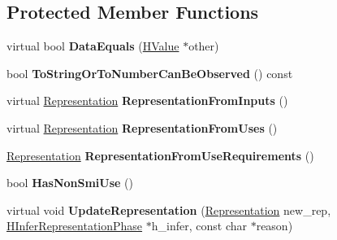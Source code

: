 \subsection*{Protected Member Functions}
\begin{DoxyCompactItemize}
\item 
\hypertarget{classv8_1_1internal_1_1_h_value_a4638f99e18888fefa1c5507f697a1688}{}virtual bool {\bfseries Data\+Equals} (\hyperlink{classv8_1_1internal_1_1_h_value}{H\+Value} $\ast$other)\label{classv8_1_1internal_1_1_h_value_a4638f99e18888fefa1c5507f697a1688}

\item 
\hypertarget{classv8_1_1internal_1_1_h_value_aca9cf9d2cd1f8ac80902f6cb10ca2da7}{}bool {\bfseries To\+String\+Or\+To\+Number\+Can\+Be\+Observed} () const \label{classv8_1_1internal_1_1_h_value_aca9cf9d2cd1f8ac80902f6cb10ca2da7}

\item 
\hypertarget{classv8_1_1internal_1_1_h_value_a8f12630b6ec6b60327b96eb4341a3e54}{}virtual \hyperlink{classv8_1_1internal_1_1_representation}{Representation} {\bfseries Representation\+From\+Inputs} ()\label{classv8_1_1internal_1_1_h_value_a8f12630b6ec6b60327b96eb4341a3e54}

\item 
\hypertarget{classv8_1_1internal_1_1_h_value_ae2750cf90b326668da92608f7faaab07}{}virtual \hyperlink{classv8_1_1internal_1_1_representation}{Representation} {\bfseries Representation\+From\+Uses} ()\label{classv8_1_1internal_1_1_h_value_ae2750cf90b326668da92608f7faaab07}

\item 
\hypertarget{classv8_1_1internal_1_1_h_value_a6f41bd071712e658e9689831cb22f4bb}{}\hyperlink{classv8_1_1internal_1_1_representation}{Representation} {\bfseries Representation\+From\+Use\+Requirements} ()\label{classv8_1_1internal_1_1_h_value_a6f41bd071712e658e9689831cb22f4bb}

\item 
\hypertarget{classv8_1_1internal_1_1_h_value_a068705f1997b6948e980a4528a212b09}{}bool {\bfseries Has\+Non\+Smi\+Use} ()\label{classv8_1_1internal_1_1_h_value_a068705f1997b6948e980a4528a212b09}

\item 
\hypertarget{classv8_1_1internal_1_1_h_value_aef5debc65c52d39fc1cbabc925b7498a}{}virtual void {\bfseries Update\+Representation} (\hyperlink{classv8_1_1internal_1_1_representation}{Representation} new\+\_\+rep, \hyperlink{classv8_1_1internal_1_1_h_infer_representation_phase}{H\+Infer\+Representation\+Phase} $\ast$h\+\_\+infer, const char $\ast$reason)\label{classv8_1_1internal_1_1_h_value_aef5debc65c52d39fc1cbabc925b7498a}


\end{DoxyCompactItemize}
